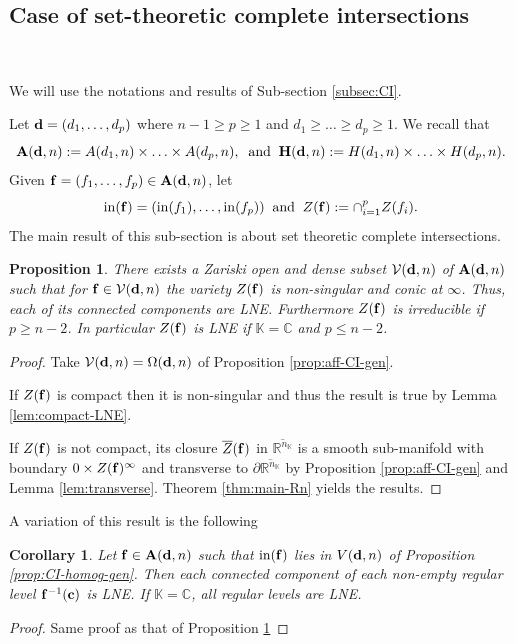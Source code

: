 \documentclass[11pt]{amsart}
\newtheorem{corollary}[theorem]{Corollary}
\newtheorem{proposition}[theorem]{Proposition}
\newcommand{\field}[1]{\mathbb{#1}}
\newcommand{\C}{\field{C}}
\newcommand{\K}{\field{K}}
\newcommand{\R}{\field{R}}
\newcommand{\bA}{{\bf A}}
\newcommand{\bc}{{\bf c}}
\newcommand{\bd}{{\bf d}}
\newcommand{\bbf}{{\bf f}}
\newcommand{\bH}{{\bf H}}
\newcommand{\cV}{\mathcal{V}}
\newcommand{\dd}{{\partial}}
\newcommand{\ini}{{\rm in}}
\newcommand{\Omg}{\Omega}
\newcommand{\Zbar}{\overline{Z}}
\numberwithin{equation}{section}
\numberwithin{equation}{section}
\begin{document}
\subsection{Case of set-theoretic complete intersections}\label{subsec:GIC-LNE}
$ $ 

We will use the notations and results of Sub-section \ref{subsec:CI}.

\medskip
Let $\bd = (d_1,\ldots,d_p)$ where $n-1 \geq p \geq 1$ and $d_1 \geq \ldots
\geq d_p \geq 1$. 
We recall that 
$$
\bA(\bd,n) := A(d_1,n) \times\ldots\times A(d_p,n), \;\;
{\rm and}  \;\;
\bH(\bd,n) := H(d_1,n)\times\ldots\times H(d_p,n). 
$$
Given $\bbf = (f_1,\ldots,f_p) \in \bA(\bd,n)$, let
$$
\ini(\bbf) = (\ini(f_1),\ldots,\ini(f_p)) \;\; {\rm and} \;\;
Z(\bbf) := \cap_{i=1}^p Z(f_i).
$$
The main result of this sub-section is about set theoretic
complete intersections.
%
%
\begin{proposition}\label{prop:CI-gen-LNE} 
There exists a Zariski open and dense subset $\cV(\bd,n)$ of $\bA(\bd,n)$ 
such that for $\bbf\in\cV(\bd,n)$ the variety $Z(\bbf)$ is non-singular
and conic at $\infty$. Thus, each of its connected components are 
LNE. Furthermore $Z(\bbf)$ is irreducible if $p\geq n-2$. In particular 
$Z(\bbf)$ is LNE if $\K = \C$ and $p\leq n-2$. 
\end{proposition}
%
%
\begin{proof} 
Take $\cV(\bd,n) =  \Omg(\bd,n)$ of Proposition \ref{prop:aff-CI-gen}.

If $Z(\bbf)$ is compact then it is non-singular and thus the result is true
by Lemma \ref{lem:compact-LNE}.

If $Z(\bbf)$ is not compact, its closure $\Zbar(\bbf)$ in 
$\overline{\R^{n_\K}}$ is a smooth sub-manifold with boundary $0\times 
Z(\bbf)^\infty$ and transverse to $\dd \overline{\R^{n_\K}}$ by Proposition 
\ref{prop:aff-CI-gen} and Lemma \ref{lem:transverse}. Theorem 
\ref{thm:main-Rn} yields the results.
\end{proof}
%
%
A variation of this result is the following
%
%
\begin{corollary}\label{cor:CI-levels-LNE}  
Let $\bbf \in \bA(\bd,n)$ such that $\ini(\bbf)$ lies in $V(\bd,n)$ of 
Proposition \ref{prop:CI-homog-gen}. Then each connected component of 
each non-empty regular level $\bbf^{-1}(\bc)$ is LNE. If $\K =\C$, all
regular levels are LNE.
\end{corollary}
%
%
\begin{proof}
Same proof as that of Proposition \ref{prop:CI-gen-LNE}
\end{proof}
%
%
\end{document}
